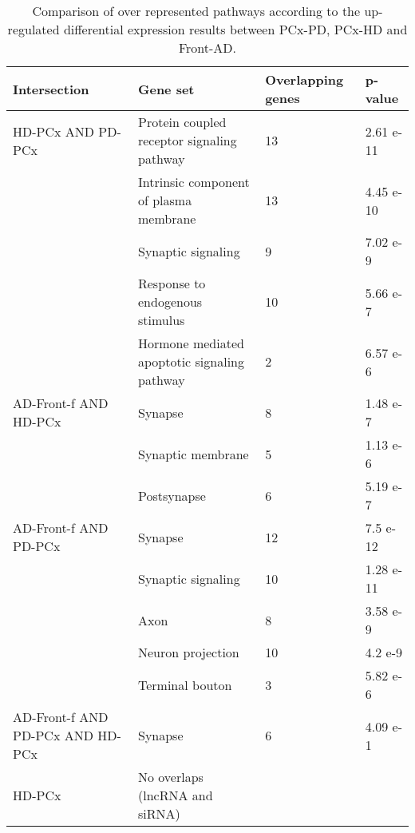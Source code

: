 \begin{table}[!ht]
\small
\centering
\caption{Comparison of over represented pathways according to the up-regulated differential expression results between PCx-PD, PCx-HD and Front-AD.}
\begin{tabularx}{13cm}{L{2cm}L{4.5cm}L{3cm}C{1.5cm}}
\toprule
\textbf{Intersection} & \textbf{Gene set} & \textbf{Overlapping genes} & \textbf{p-value} \\
\midrule
HD-PCx AND PD-PCx                      & Protein coupled receptor signaling pathway & 13                         & 2.61 e-11        \\
                                 & Intrinsic component of plasma membrane       & 13  & 4.45 e-10  \\
                                 & Synaptic signaling                           & 9   & 7.02 e-9   \\
                                 & Response to endogenous stimulus              & 10  & 5.66 e-7   \\
                                 & Hormone mediated apoptotic signaling pathway & 2   & 6.57 e-6   \\
AD-Front-f AND HD-PCx            & Synapse                                        & 8   & 1.48 e-7   \\
                                 & Synaptic membrane                            & 5   & 1.13 e-6   \\
                                 & Postsynapse                                    & 6   & 5.19 e-7   \\
AD-Front-f AND PD-PCx            & Synapse                                        & 12  & 7.5 e-12   \\
                                 & Synaptic signaling                           & 10  & 1.28 e-11  \\
                                 & Axon                                           & 8   & 3.58 e-9   \\
                                 & Neuron projection                            & 10  & 4.2 e-9    \\
                                 & Terminal bouton                              & 3   & 5.82 e-6   \\
AD-Front-f AND PD-PCx AND HD-PCx & Synapse                                        & 6   & 4.09 e-1   \\
HD-PCx                           & No overlaps (lncRNA and siRNA)          &     &            \\

\end{tabularx}
\end{table}

